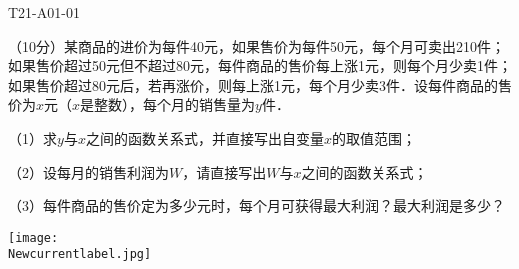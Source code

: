 

\begin{defproblem}{T21-A01-01}%
\begin{onlyproblem}%
（10分）某商品的进价为每件40元，如果售价为每件50元，每个月可卖出210件；如果售价超过50元但不超过80元，每件商品的售价每上涨1元，则每个月少卖1件；如果售价超过80元后，若再涨价，则每上涨1元，每个月少卖3件．设每件商品的售价为$x$元（$x$是整数），每个月的销售量为$y$件．

（1）求$y$与$x$之间的函数关系式，并直接写出自变量$x$的取值范围；

（2）设每月的销售利润为$W$，请直接写出$W$与$x$之间的函数关系式；

（3）每件商品的售价定为多少元时，每个月可获得最大利润？最大利润是多少？
\end{onlyproblem}%
\begin{onlysolution}%

\texttt{[image: \\Newcurrentlabel.jpg]}

\end{onlysolution}%
\end{defproblem}


